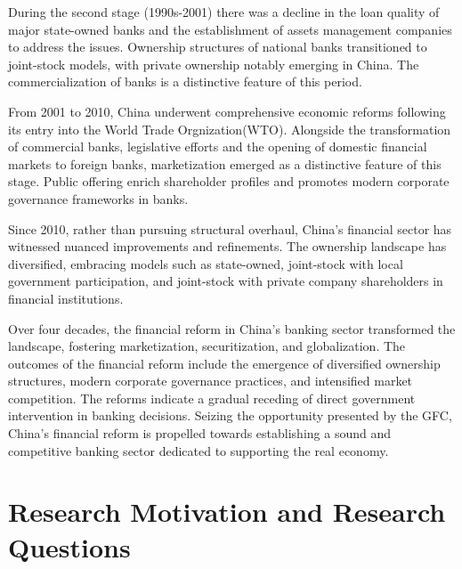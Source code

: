 \documentclass[
  12pt,
  a4paper,
]{scrreprt}
\begin{document}
During the second stage (1990s-2001) there was a decline in the loan
quality of major state-owned banks and the establishment of assets
management companies to address the issues. Ownership structures of
national banks transitioned to joint-stock models, with private
ownership notably emerging in China. The commercialization of banks is a
distinctive feature of this period.

From 2001 to 2010, China underwent comprehensive economic reforms
following its entry into the World Trade Orgnization(WTO). Alongside the
transformation of commercial banks, legislative efforts and the opening
of domestic financial markets to foreign banks, marketization emerged as
a distinctive feature of this stage. Public offering enrich shareholder
profiles and promotes modern corporate governance frameworks in banks.

Since 2010, rather than pursuing structural overhaul, China's financial
sector has witnessed nuanced improvements and refinements. The ownership
landscape has diversified, embracing models such as state-owned,
joint-stock with local government participation, and joint-stock with
private company shareholders in financial institutions.

Over four decades, the financial reform in China's banking sector
transformed the landscape, fostering marketization, securitization, and
globalization. The outcomes of the financial reform include the
emergence of diversified ownership structures, modern corporate
governance practices, and intensified market competition. The reforms
indicate a gradual receding of direct government intervention in banking
decisions. Seizing the opportunity presented by the GFC, China's
financial reform is propelled towards establishing a sound and
competitive banking sector dedicated to supporting the real economy.

\section{Research Motivation and Research
Questions}\label{research-motivation-and-research-questions}
\end{document}
